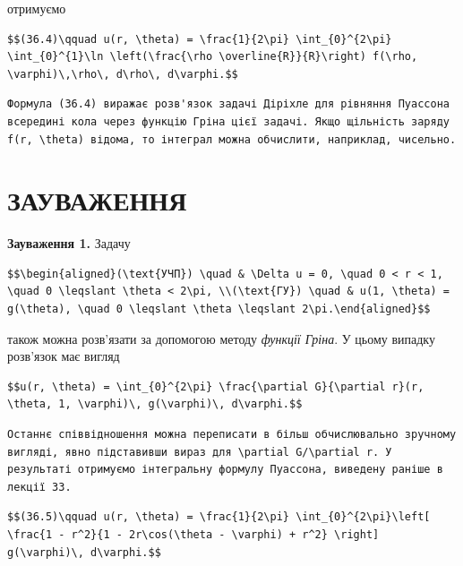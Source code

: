 \documentclass[
  ukrainian,
]{article}
\begin{document}
отримуємо

\begin{verbatim}
$$(36.4)\qquad u(r, \theta) = \frac{1}{2\pi} \int_{0}^{2\pi} \int_{0}^{1}\ln \left(\frac{\rho \overline{R}}{R}\right) f(\rho, \varphi)\,\rho\, d\rho\, d\varphi.$$
\end{verbatim}

\begin{verbatim}
Формула (36.4) виражає розв'язок задачі Діріхле для рівняння Пуассона всередині кола через функцію Гріна цієї задачі. Якщо щільність заряду f(r, \theta) відома, то інтеграл можна обчислити, наприклад, чисельно.
\end{verbatim}

\section{ЗАУВАЖЕННЯ}\label{ux437ux430ux443ux432ux430ux436ux435ux43dux43dux44f-12}

\textbf{Зауваження 1.} Задачу

\begin{verbatim}
$$\begin{aligned}(\text{УЧП}) \quad & \Delta u = 0, \quad 0 < r < 1, \quad 0 \leqslant \theta < 2\pi, \\(\text{ГУ}) \quad & u(1, \theta) = g(\theta), \quad 0 \leqslant \theta \leqslant 2\pi.\end{aligned}$$
\end{verbatim}

також можна розв'язати за допомогою методу \emph{функції Гріна}. У цьому
випадку розв'язок має вигляд

\begin{verbatim}
$$u(r, \theta) = \int_{0}^{2\pi} \frac{\partial G}{\partial r}(r, \theta, 1, \varphi)\, g(\varphi)\, d\varphi.$$
\end{verbatim}

\begin{verbatim}
Останнє співвідношення можна переписати в більш обчислювально зручному вигляді, явно підставивши вираз для \partial G/\partial r. У результаті отримуємо інтегральну формулу Пуассона, виведену раніше в лекції 33.
\end{verbatim}

\begin{verbatim}
$$(36.5)\qquad u(r, \theta) = \frac{1}{2\pi} \int_{0}^{2\pi}\left[ \frac{1 - r^2}{1 - 2r\cos(\theta - \varphi) + r^2} \right] g(\varphi)\, d\varphi.$$
\end{verbatim}
\end{document}
